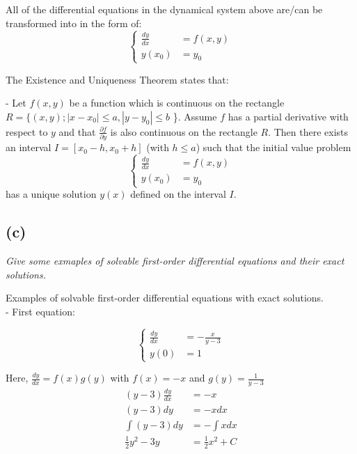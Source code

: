 \documentclass[a4paper]{article}
\begin{document}
All of the differential equations in the dynamical system above are/can be transformed into in the form of:
\begin{equation*}
  \begin{cases}
    \frac{dy}{dx} & = f(x,y) \\
    y(x_0)        & = y_0
  \end{cases}
\end{equation*}

The Existence and Uniqueness Theorem states that:

- Let \(f(x,y)\) be a function which is continuous on the rectangle  \(R = \{(x, y); |x - x_0| \leq a, |y - y_0| \leq b\) \}.
Assume \(f\) has a partial derivative with respect to \(y\) and that \(\frac{\partial f}{\partial y}\) is also continuous on the rectangle \(R\).
Then there exists an interval \(I=[x_0-h, x_0+h]\) (with \(h \leq a\)) such that the initial value problem
\begin{equation*}
  \begin{cases}
    \frac{dy}{dx} & = f(x,y) \\
    y(x_0)        & = y_0
  \end{cases}
\end{equation*}
has a unique solution \(y(x)\) defined on the interval \(I\).

\subsection{(c)}
\textit{Give some exmaples of solvable first-order differential equations and their exact solutions.}


Examples of solvable first-order differential equations with exact solutions. \\

- First equation:

\begin{equation*}
  \begin{cases}
    \frac{dy}{dx} & = - \frac{x}{y-3} \\
    y(0)          & = 1
  \end{cases}
\end{equation*}

Here, \(\frac{dy}{dx} = f(x)g(y)\) with \(f(x) = -x\) and \(g(y) = \frac{1}{y-3}\) \\

\begin{align*}
  (y - 3) \frac{dy}{dx} & = -x                  \\
  (y - 3) dy            & = -x dx               \\
  \int (y - 3) dy       & = -\int xdx           \\
  \frac {1}{2} y^2 - 3y & = \frac{1}{2} x^2 + C
\end{align*}
\end{document}
